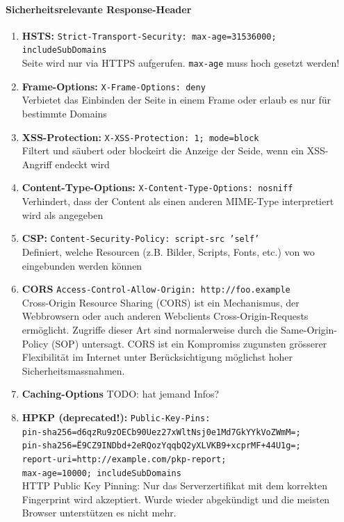 \documentclass[10pt,a4paper]{article}
\begin{document}
\paragraph*{Sicherheitsrelevante Response-Header}
\begin{enumerate}[noitemsep,topsep=0pt,leftmargin=*]
    \item \textbf{HSTS:} \texttt{Strict-Transport-Security: max-age=31536000; includeSubDomains}\\
    Seite wird nur via HTTPS aufgerufen. \texttt{max-age} muss hoch gesetzt werden!
    \item \textbf{Frame-Options:} \texttt{X-Frame-Options: deny}\\
    Verbietet das Einbinden der Seite in einem Frame oder erlaub es nur für bestimmte Domains
    \item \textbf{XSS-Protection:} \texttt{X-XSS-Protection: 1; mode=block}\\
    Filtert und säubert oder blockeirt die Anzeige der Seide, wenn ein XSS-Angriff endeckt wird
    \item \textbf{Content-Type-Options:} \texttt{X-Content-Type-Options: nosniff}\\
    Verhindert, dass der Content als einen anderen MIME-Type interpretiert wird als angegeben
    \item \textbf{CSP:} \texttt{Content-Security-Policy: script-src 'self'}\\
    Definiert, welche Resourcen (z.B. Bilder, Scripts, Fonts, etc.) von wo eingebunden werden können
    \item \textbf{CORS} \texttt{Access-Control-Allow-Origin: http://foo.example}\\
    Cross-Origin Resource Sharing (CORS) ist ein Mechanismus, der Webbrowsern oder auch anderen Webclients Cross-Origin-Requests ermöglicht. Zugriffe dieser Art sind normalerweise durch die Same-Origin-Policy (SOP) untersagt. CORS ist ein Kompromiss zugunsten grösserer Flexibilität im Internet unter Berücksichtigung möglichst hoher Sicherheitsmassnahmen.
    \item \textbf{Caching-Options} {\color{red}TODO: hat jemand Infos?}
    \item \textbf{HPKP ({\color{red}deprecated!}):} \texttt{Public-Key-Pins:\\
    pin-sha256=d6qzRu9zOECb90Uez27xWltNsj0e1Md7GkYYkVoZWmM=;\\
    pin-sha256=Ë9CZ9INDbd+2eRQozYqqbQ2yXLVKB9+xcprMF+44U1g=;\\
    report-uri=http://example.com/pkp-report;\\
    max-age=10000; includeSubDomains}\\
    HTTP Public Key Pinning: Nur das Serverzertifikat mit dem korrekten Fingerprint wird akzeptiert. Wurde wieder abgekündigt und die meisten Browser unterstützen es nicht mehr.
\end{enumerate}
\end{document}
